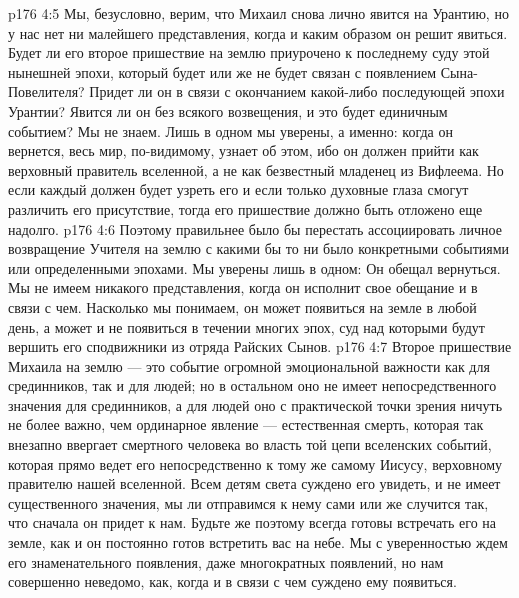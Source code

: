 \vs p176 4:5 Мы, безусловно, верим, что Михаил снова лично явится на Урантию, но у нас нет ни малейшего представления, когда и каким образом он решит явиться. Будет ли его второе пришествие на землю приурочено к последнему суду этой нынешней эпохи, который будет или же не будет связан с появлением Сына\hyp{}Повелителя? Придет ли он в связи с окончанием какой\hyp{}либо последующей эпохи Урантии? Явится ли он без всякого возвещения, и это будет единичным событием? Мы не знаем. Лишь в одном мы уверены, а именно: когда он вернется, весь мир, по\hyp{}видимому, узнает об этом, ибо он должен прийти как верховный правитель вселенной, а не как безвестный младенец из Вифлеема. Но если каждый должен будет узреть его и если только духовные глаза смогут различить его присутствие, тогда его пришествие должно быть отложено еще надолго.
\vs p176 4:6 Поэтому правильнее было бы перестать ассоциировать личное возвращение Учителя на землю с какими бы то ни было конкретными событиями или определенными эпохами. Мы уверены лишь в одном: Он обещал вернуться. Мы не имеем никакого представления, когда он исполнит свое обещание и в связи с чем. Насколько мы понимаем, он может появиться на земле в любой день, а может и не появиться в течении многих эпох, суд над которыми будут вершить его сподвижники из отряда Райских Сынов.
\vs p176 4:7 Второе пришествие Михаила на землю --- это событие огромной эмоциональной важности как для срединников, так и для людей; но в остальном оно не имеет непосредственного значения для срединников, а для людей оно с практической точки зрения ничуть не более важно, чем ординарное явление --- естественная смерть, которая так внезапно ввергает смертного человека во власть той цепи вселенских событий, которая прямо ведет его непосредственно к тому же самому Иисусу, верховному правителю нашей вселенной. Всем детям света суждено его увидеть, и не имеет существенного значения, мы ли отправимся к нему сами или же случится так, что сначала он придет к нам. Будьте же поэтому всегда готовы встречать его на земле, как и он постоянно готов встретить вас на небе. Мы с уверенностью ждем его знаменательного появления, даже многократных появлений, но нам совершенно неведомо, как, когда и в связи с чем суждено ему появиться.
